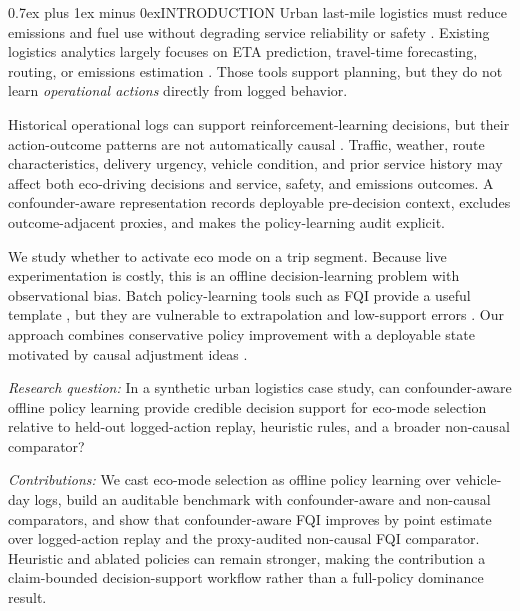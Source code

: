 \documentclass[a4paper,conference]{IEEEtran}
\makeatletter
\def\section{\@startsection{section}{1}{\z@}{1.5ex plus 1.5ex minus 0.5ex}%
  {0.7ex plus 1ex minus 0ex}{\normalfont\normalsize\centering}}
\makeatother
\begin{document}
\section{INTRODUCTION}
Urban last-mile logistics must reduce emissions and fuel use without degrading service reliability or safety \cite{demir_green_2014,dekker2012or}. Existing logistics analytics largely focuses on ETA prediction, travel-time forecasting, routing, or emissions estimation \cite{derrow2021eta,wang2019simple,li2018dcrnn,toth2014vrp}. Those tools support planning, but they do not learn \emph{operational actions} directly from logged behavior.

Historical operational logs can support reinforcement-learning decisions, but their action-outcome patterns are not automatically causal \cite{pearl2009causality,hernan2020causal,lu2018deconfounding}. Traffic, weather, route characteristics, delivery urgency, vehicle condition, and prior service history may affect both eco-driving decisions and service, safety, and emissions outcomes. A confounder-aware representation records deployable pre-decision context, excludes outcome-adjacent proxies, and makes the policy-learning audit explicit.

We study whether to activate eco mode on a trip segment. Because live experimentation is costly, this is an offline decision-learning problem with observational bias. Batch policy-learning tools such as FQI provide a useful template \cite{levine2020offline,ernst2005tree,fujimoto2019bcq}, but they are vulnerable to extrapolation and low-support errors \cite{kumar2020cql,laroche2019spibb,prudencio2023survey}. Our approach combines conservative policy improvement with a deployable state motivated by causal adjustment ideas \cite{pearl2009causality,hernan2020causal,bareinboim2016causal,zhang2019dtr,lu2018deconfounding}.

\textit{Research question:} In a synthetic urban logistics case study, can confounder-aware offline policy learning provide credible decision support for eco-mode selection relative to held-out logged-action replay, heuristic rules, and a broader non-causal comparator?

\textit{Contributions:} We cast eco-mode selection as offline policy learning over vehicle-day logs, build an auditable benchmark with confounder-aware and non-causal comparators, and show that confounder-aware FQI improves by point estimate over logged-action replay and the proxy-audited non-causal FQI comparator. Heuristic and ablated policies can remain stronger, making the contribution a claim-bounded decision-support workflow rather than a full-policy dominance result.
\end{document}
